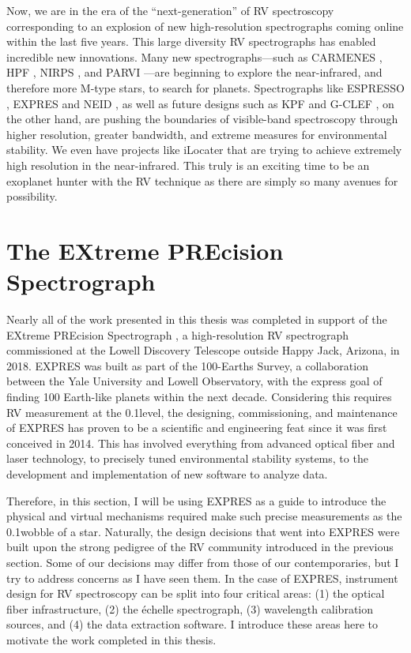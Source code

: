 Now, we are in the era of the ``next-generation'' of RV spectroscopy corresponding to an explosion of new high-resolution spectrographs coming online within the last five years. This large diversity RV spectrographs has enabled incredible new innovations. Many new spectrographs---such as CARMENES \citep{quirrenbach_carmenes_2016}, HPF \citep{mahadevan_habitable-zone_2014}, NIRPS \citep{wildi_nirps_2017}, and PARVI \citep{gibson_characterization_2020}---are beginning to explore the near-infrared, and therefore more M-type stars, to search for planets. Spectrographs like ESPRESSO \citep{pepe_espresso_2013}, EXPRES \citep{jurgenson_expres_2016} and NEID \citep{schwab_design_2016}, as well as future designs such as KPF \citep{gibson_kpf_2016} and G-CLEF \citep{szentgyorgyi_gmt-consortium_2016}, on the other hand, are pushing the boundaries of visible-band spectroscopy through higher resolution, greater bandwidth, and extreme measures for environmental stability. We even have projects like iLocater \citep{crepp_ilocater_2016} that are trying to achieve extremely high resolution in the near-infrared. This truly is an exciting time to be an exoplanet hunter with the RV technique as there are simply so many avenues for possibility.

\section{The EXtreme PREcision Spectrograph} \label{intro:expres}

Nearly all of the work presented in this thesis was completed in support of the EXtreme PREcision Spectrograph \citep[EXPRES;][]{jurgenson_expres_2016, blackman_performance_2020, petersburg_extreme-precision_2020}, a high-resolution RV spectrograph commissioned at the Lowell Discovery Telescope outside Happy Jack, Arizona, in 2018. EXPRES was built as part of the 100-Earths Survey, a collaboration between the Yale University and Lowell Observatory, with the express goal of finding 100 Earth-like planets within the next decade. Considering this requires RV measurement at the 0.1\ms level, the designing, commissioning, and maintenance of EXPRES has proven to be a scientific and engineering feat since it was first conceived in 2014. This has involved everything from advanced optical fiber and laser technology, to precisely tuned environmental stability systems, to the development and implementation of new software to analyze data.

Therefore, in this section, I will be using EXPRES as a guide to introduce the physical and virtual mechanisms required make such precise measurements as the 0.1\ms wobble of a star. Naturally, the design decisions that went into EXPRES were built upon the strong pedigree of the RV community introduced in the previous section. Some of our decisions may differ from those of our contemporaries, but I try to address concerns as I have seen them. In the case of EXPRES, instrument design for RV spectroscopy can be split into four critical areas: (1) the optical fiber infrastructure, (2) the \'echelle spectrograph, (3) wavelength calibration sources, and (4) the data extraction software. I introduce these areas here to motivate the work completed in this thesis.

